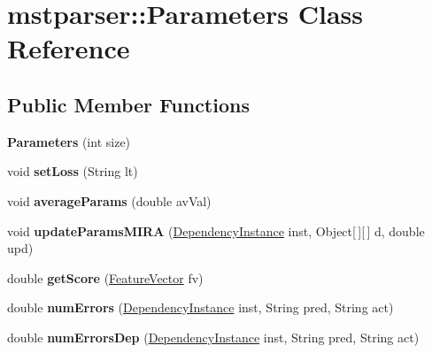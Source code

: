 \hypertarget{classmstparser_1_1Parameters}{
\section{mstparser::Parameters Class Reference}
\label{classmstparser_1_1Parameters}
}
\subsection*{Public Member Functions}
\begin{DoxyCompactItemize}
\item 
\hypertarget{classmstparser_1_1Parameters_a5e02754331c715de3257291c29641563}{
{\bfseries Parameters} (int size)}
\label{classmstparser_1_1Parameters_a5e02754331c715de3257291c29641563}

\item 
\hypertarget{classmstparser_1_1Parameters_a03db50e24e163102327515621a418ac6}{
void {\bfseries setLoss} (String lt)}
\label{classmstparser_1_1Parameters_a03db50e24e163102327515621a418ac6}

\item 
\hypertarget{classmstparser_1_1Parameters_ad57ecfbe393829921eba8cea3106df0b}{
void {\bfseries averageParams} (double avVal)}
\label{classmstparser_1_1Parameters_ad57ecfbe393829921eba8cea3106df0b}

\item 
\hypertarget{classmstparser_1_1Parameters_a3ab5e7f434d6581409fc8d030f87bb6d}{
void {\bfseries updateParamsMIRA} (\hyperlink{classmstparser_1_1DependencyInstance}{DependencyInstance} inst, Object\mbox{[}$\,$\mbox{]}\mbox{[}$\,$\mbox{]} d, double upd)}
\label{classmstparser_1_1Parameters_a3ab5e7f434d6581409fc8d030f87bb6d}

\item 
\hypertarget{classmstparser_1_1Parameters_a612ec4f64866159484344e8c96719060}{
double {\bfseries getScore} (\hyperlink{classmstparser_1_1FeatureVector}{FeatureVector} fv)}
\label{classmstparser_1_1Parameters_a612ec4f64866159484344e8c96719060}

\item 
\hypertarget{classmstparser_1_1Parameters_a35d2458456ef7cafb5d4268df6f87642}{
double {\bfseries numErrors} (\hyperlink{classmstparser_1_1DependencyInstance}{DependencyInstance} inst, String pred, String act)}
\label{classmstparser_1_1Parameters_a35d2458456ef7cafb5d4268df6f87642}

\item 
\hypertarget{classmstparser_1_1Parameters_a7bc550455311b6f6010c85527e38c193}{
double {\bfseries numErrorsDep} (\hyperlink{classmstparser_1_1DependencyInstance}{DependencyInstance} inst, String pred, String act)}
\label{classmstparser_1_1Parameters_a7bc550455311b6f6010c85527e38c193}


\end{DoxyCompactItemize}
